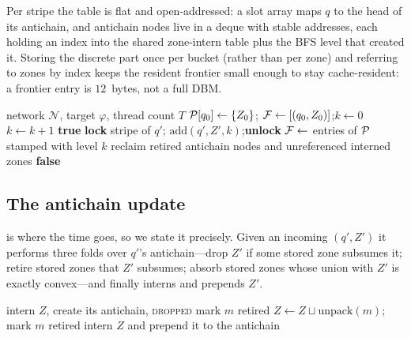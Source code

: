 Per stripe the table is flat and open-addressed: a slot array maps $q$ to the
head of its antichain, and antichain nodes live in a deque with stable addresses,
each holding an index into the shared zone-intern table plus the BFS level that
created it.  Storing the discrete part once per bucket (rather than per zone) and
referring to zones by index keeps the resident frontier small enough to stay
cache-resident: a frontier entry is $12$~bytes, not a full DBM.

\begin{algorithm}[t]
\caption{Level-synchronous parallel BFS with a striped shared passed list}
\label{alg:par}
\begin{algorithmic}[1]
\Require network $\mathcal{N}$, target $\varphi$, thread count $T$
\State $\mathcal{P}[q_0] \leftarrow \{Z_0\}$;\enspace
       $\mathcal{F} \leftarrow [(q_0, Z_0)]$;\enspace $k \leftarrow 0$
\While{$\Frontier \neq \emptyset$}
  \State $k \leftarrow k+1$
       \Return \textbf{true} \EndIf
      \State \textbf{lock} stripe of $q'$;\enspace
             $\mathrm{add}(q', Z', k)$;\enspace \textbf{unlock}
    \EndFor
  \EndParFor
  \State $\mathcal{F} \leftarrow$ entries of $\mathcal{P}$ stamped with level $k$
  \State reclaim retired antichain nodes and unreferenced interned zones
\EndWhile
\Return \textbf{false}
\end{algorithmic}
\end{algorithm}

\subsection{The antichain update}

 is where the time goes, so we state it precisely.  Given an
incoming $(q', Z')$ it performs three folds over $q'$'s antichain---drop $Z'$ if
some stored zone subsumes it; retire stored zones that $Z'$ subsumes; absorb
stored zones whose union with $Z'$ is exactly convex---and finally interns and
prepends $Z'$.

\begin{algorithm}[t]
\caption{$\mathrm{add}(q, Z, k)$ --- antichain update (original)}\label{alg:add}
\begin{algorithmic}[1]
 intern $Z$, create its antichain, \Return \EndIf
{}
   \Return \textsc{dropped} \EndIf
\EndFor
{}
   mark $m$ retired \EndIf
\EndFor
{}
  \State $Z \leftarrow Z \sqcup \mathrm{unpack}(m)$; mark $m$ retired
\EndWhile
\State intern $Z$ and prepend it to the antichain
\end{algorithmic}
\end{algorithm}


